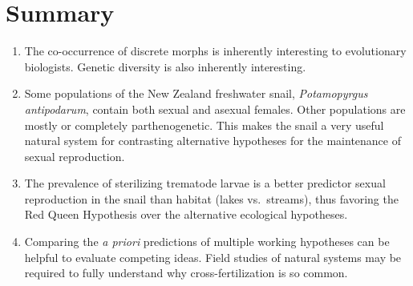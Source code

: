 \documentclass[
  letterpaper,
]{book}
\begin{document}
\section{Summary}\label{summary-2}

\begin{enumerate}
\def\labelenumi{\arabic{enumi}.}
\item
  The co-occurrence of discrete morphs is inherently interesting to
  evolutionary biologists. Genetic diversity is also inherently
  interesting.
\item
  Some populations of the New Zealand freshwater snail,
  \emph{Potamopyrgus antipodarum}, contain both sexual and asexual
  females. Other populations are mostly or completely parthenogenetic.
  This makes the snail a very useful natural system for contrasting
  alternative hypotheses for the maintenance of sexual reproduction.
\item
  The prevalence of sterilizing trematode larvae is a better predictor
  sexual reproduction in the snail than habitat (lakes vs.~streams),
  thus favoring the Red Queen Hypothesis over the alternative ecological
  hypotheses.
\item
  Comparing the \emph{a priori} predictions of multiple working
  hypotheses can be helpful to evaluate competing ideas. Field studies
  of natural systems may be required to fully understand why
  cross-fertilization is so common.
\end{enumerate}

~
\end{document}
